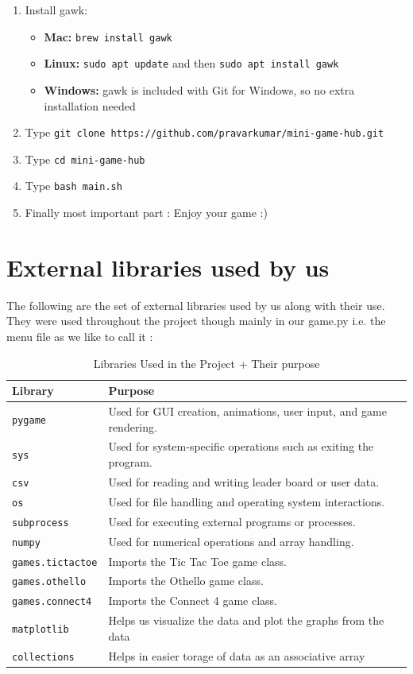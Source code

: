 \documentclass{article}
\begin{document}
\begin{enumerate}
    \item Install gawk:
    \begin{itemize}
        \item \textbf{Mac:} \texttt{brew install gawk}
        \item \textbf{Linux:} \texttt{sudo apt update} and then \texttt{sudo apt install gawk}
        \item \textbf{Windows:} gawk is included with Git for Windows, so no extra installation needed
    \end{itemize}


    \item Type \texttt{git clone https://github.com/pravarkumar/mini-game-hub.git}
    \item Type \texttt{cd mini-game-hub}
    \item Type \texttt{bash main.sh}
     \item Finally most important part : Enjoy your game :)
\end{enumerate}
\section*{External libraries used by us }
The following are the set of external libraries used by us along with their use. They were used throughout the project though mainly in our game.py i.e. the menu file as we like to call it :
\begin{table}[H]
\centering
\begin{tabular}{|l|p{9cm}|}
\hline
\textbf{Library} & \textbf{Purpose} \\ 
\hline
\texttt{pygame} & Used for GUI creation, animations, user input, and game rendering. \\ 
\hline
\texttt{sys} & Used for system-specific operations such as exiting the program. \\ 
\hline
\texttt{csv} & Used for reading and writing leader board or user data. \\ 
\hline
\texttt{os} & Used for file handling and operating system interactions. \\ 
\hline
\texttt{subprocess} & Used for executing external programs or processes. \\ 
\hline
\texttt{numpy} & Used for numerical operations and array handling. \\ 
\hline
\texttt{games.tictactoe} & Imports the Tic Tac Toe game class. \\ 
\hline
\texttt{games.othello} & Imports the Othello game class. \\ 
\hline
\texttt{games.connect4} & Imports the Connect 4 game class. \\ 
\hline
\texttt{matplotlib} & Helps us visualize the data and plot the graphs from the data \\ 
\hline
\texttt{collections} & Helps in easier torage of data as an associative array \\ 
\hline
\end{tabular}
\caption{Libraries Used in the Project + Their purpose}
\end{table}
\end{document}
